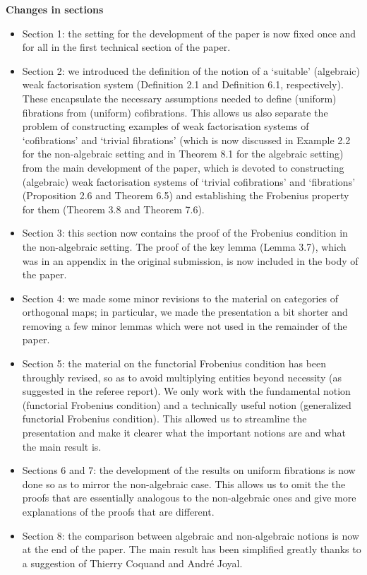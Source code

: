\documentclass[reqno,10pt,a4paper,oneside,draft]{amsart}
\begin{document}
{\bf Changes in sections} 
\begin{itemize}
\item Section 1: the setting for the development of the paper is now fixed once and for all in the first technical section of the paper. 
\item Section 2: we introduced the definition of the notion of a `suitable' (algebraic) weak factorisation system (Definition 2.1 and Definition 6.1, respectively). These encapsulate the necessary 
assumptions needed to define (uniform) fibrations from (uniform) cofibrations. This allows us also separate the problem of constructing examples of weak factorisation systems
of `cofibrations' and `trivial fibrations' (which is now discussed  in Example 2.2 for the non-algebraic setting and in Theorem 8.1 for the algebraic setting) from the main development of the paper, which is devoted to constructing (algebraic) weak factorisation systems of
`trivial cofibrations' and `fibrations' (Proposition 2.6 and Theorem 6.5) and 
establishing the 
Frobenius property for them (Theorem 3.8 and Theorem 7.6).
\item Section 3: this section now contains the proof of the Frobenius condition in the non-algebraic setting. The proof of the key lemma (Lemma 3.7), which was in an appendix in the original submission,  is now included in the body of the paper.
\item Section 4: we made some minor revisions to the material on categories of orthogonal maps;
in particular, we made the presentation a bit shorter and removing a few minor 
lemmas which were not  used  in the remainder of the paper.
\item Section 5: the material on the functorial Frobenius condition  has been throughly revised, so as to avoid multiplying entities beyond necessity (as suggested in the referee report). We only work with the fundamental notion (functorial Frobenius condition) and a technically useful notion (generalized functorial Frobenius condition). This allowed us to streamline the presentation 
and make it clearer what the important notions are and what the main result is. 
\item Sections 6 and 7: the development of the results on uniform fibrations 
is now done so as to mirror the non-algebraic case. This allows us to omit the 
the proofs that are essentially analogous to the non-algebraic ones and 
give more explanations of the proofs that are different.
\item Section 8: the comparison between algebraic and non-algebraic notions is now at the end of the paper. The main result has been simplified greatly thanks to a
suggestion of Thierry Coquand and Andr\'e Joyal. 
\end{itemize}
\end{document}
